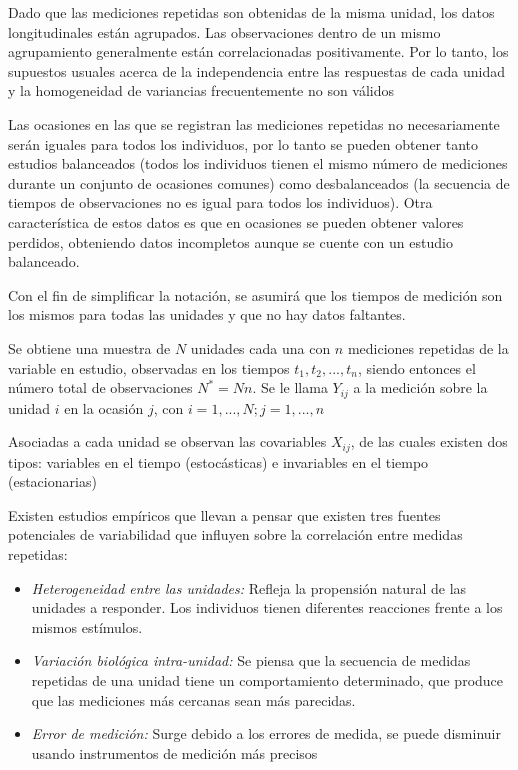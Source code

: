 \documentclass[spanish]{article}
\numberwithin{figure}{subsection}
\numberwithin{equation}{subsection}
\numberwithin{table}{subsection}
\begin{document}
Dado que las mediciones repetidas son obtenidas de la misma unidad, los datos
longitudinales están agrupados. Las observaciones dentro de un mismo
agrupamiento generalmente están correlacionadas positivamente. Por lo tanto,
los supuestos usuales acerca de la independencia entre las respuestas de cada
unidad y la homogeneidad de variancias frecuentemente no son válidos

Las ocasiones en las que se registran las mediciones repetidas no
necesariamente serán iguales para todos los individuos, por lo tanto se pueden
obtener tanto estudios balanceados (todos los individuos tienen el mismo número
de mediciones durante un conjunto de ocasiones comunes) como desbalanceados (la
secuencia de tiempos de observaciones no es igual para todos los individuos).
Otra característica de estos datos es que en ocasiones se pueden obtener
valores perdidos, obteniendo datos incompletos aunque se cuente con un estudio
balanceado.

Con el fin de simplificar la notación, se asumirá que los tiempos de medición
son los mismos para todas las unidades y que no hay datos faltantes.

Se obtiene una muestra de $N$ unidades cada una con $n$ mediciones repetidas de
la variable en estudio, observadas en los tiempos $t_1, t_2, ..., t_n$, siendo
entonces el número total de observaciones $N^*=Nn$. Se le llama $Y_{ij}$ a la
medición sobre la unidad $i$ en la ocasión $j$, con $i=1, ..., N; j=1, ..., n$

Asociadas a cada unidad se observan las covariables $X_{ij}$, de las cuales
existen dos tipos: variables en el tiempo (estocásticas) e invariables en el
tiempo (estacionarias)

Existen estudios empíricos que llevan a pensar que existen tres fuentes
potenciales de variabilidad que influyen sobre la correlación entre medidas
repetidas:

\begin{itemize}
	\item \textit{Heterogeneidad entre las unidades:} Refleja la propensión
	natural de las unidades a responder. Los individuos tienen diferentes
	reacciones frente a los mismos estímulos.
	\item \textit{Variación biológica intra-unidad:} Se piensa que la secuencia
	de medidas repetidas de una unidad tiene un comportamiento determinado, que
	produce que las mediciones más cercanas sean más parecidas.
	\item \textit{Error de medición:} Surge debido a los errores de medida, se
	puede disminuir usando instrumentos de medición más precisos
\end{itemize}
\end{document}
